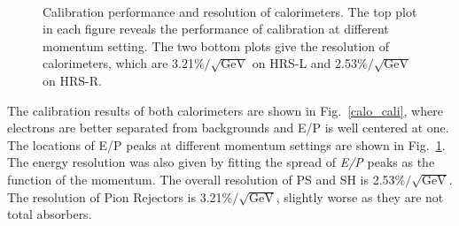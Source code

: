 \begin{figure}[!ht]
  \begin{center}
    \\ 
    \caption[Calibration performance and resolution of calorimeters]{\footnotesize{Calibration performance and resolution of calorimeters. The top plot in each figure reveals the performance of calibration at different momentum setting. The two bottom plots give the resolution of calorimeters, which are 3.21\%$\mathrm{/\sqrt{GeV}}$ on HRS-L and 2.53\%$\mathrm{/\sqrt{GeV}}$ on HRS-R.} }
    \label{calo_resol}
  \end{center}
\end{figure}

 The calibration results of both calorimeters are shown in Fig.~\ref{calo_cali}, where electrons are better separated from backgrounds and E/P is well centered at one. The locations of E/P peaks at different momentum settings are shown in Fig.~\ref{calo_resol}. The energy resolution was also given by fitting the spread of \emph{E/P} peaks as the function of the momentum. The overall resolution of PS and SH is 2.53\%$\mathrm{/\sqrt{GeV}}$. The resolution of Pion Rejectors is 3.21\%$/\mathrm{\sqrt{GeV}}$, slightly worse as they are not total absorbers.